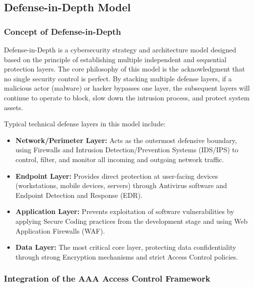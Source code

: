 \subsection{Defense-in-Depth Model}

\subsubsection{Concept of Defense-in-Depth}

Defense-in-Depth is a cybersecurity strategy and architecture model designed based on the principle of establishing multiple independent and sequential protection layers. The core philosophy of this model is the acknowledgment that no single security control is perfect. By stacking multiple defense layers, if a malicious actor (malware) or hacker bypasses one layer, the subsequent layers will continue to operate to block, slow down the intrusion process, and protect system assets.

Typical technical defense layers in this model include:

\begin{itemize}
    \item \textbf{Network/Perimeter Layer:} Acts as the outermost defensive boundary, using Firewalls and Intrusion Detection/Prevention Systems (IDS/IPS) to control, filter, and monitor all incoming and outgoing network traffic.
    
    \item \textbf{Endpoint Layer:} Provides direct protection at user-facing devices (workstations, mobile devices, servers) through Antivirus software and Endpoint Detection and Response (EDR).
    
    \item \textbf{Application Layer:} Prevents exploitation of software vulnerabilities by applying Secure Coding practices from the development stage and using Web Application Firewalls (WAF).
    
    \item \textbf{Data Layer:} The most critical core layer, protecting data confidentiality through strong Encryption mechanisms and strict Access Control policies.
\end{itemize}

\subsubsection{Integration of the AAA Access Control Framework}

